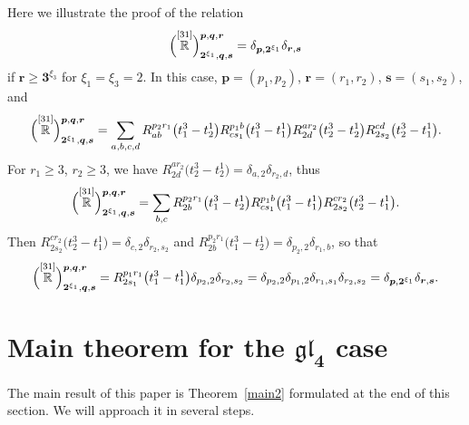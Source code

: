 \documentclass[10pt,a4paper]{amsart}
\numberwithin{equation}{section}
\begin{document}
\begin{Example} Here we illustrate the proof of the relation
\[
\Bigl(\overset{[31]}{\mathbb{R}} \Big)^{\boldsymbol{p},\boldsymbol{q},\boldsymbol{r}}_{\boldsymbol{2}^{\xi_1}, \boldsymbol{q},\boldsymbol{s}}=\delta_{\boldsymbol{p},\boldsymbol{2}^{\xi_1}} \delta_{\boldsymbol{r},\boldsymbol{s}}
\]
 if $\boldsymbol{r}\geq \boldsymbol {3}^{\xi_3}$ for $\xi_1=\xi_3=2$. In this case, $ \boldsymbol{p}=(p_1,p_2)$, $\boldsymbol{r}=(r_1,r_2)$, $\boldsymbol{s}=(s_1,s_2)
$, and
\begin{equation*}
\Bigl(\overset{[31]}{\mathbb{R}} \Big)^{\boldsymbol{p},\boldsymbol{q},\boldsymbol{r}}_{\boldsymbol{2}^{\xi_1},\boldsymbol{q},\boldsymbol{s}}= \sum_{a,b,c,d}{R}^{p_2r_1}_{ab}\bigl(t^3_1-t^1_2\bigr) {R}^{p_1 b}_{cs_1}\bigl(t^3_1-t^1_1\bigr) {R}^{ar_2}_{2d}\bigl(t^3_2-t^1_2\bigr) {R}^{cd}_{2s_2}\bigl(t^3_2-t^1_1\bigr).
\end{equation*}
For $r_1\geq 3$, $r_2\geq 3$, we have ${R}^{ar_2}_{2d}\bigl(t^3_2-t^1_2\bigr)=\delta_{a,2} \delta_{r_2,d}$, thus
\begin{equation*}
\Bigl(\overset{[31]}{\mathbb{R}} \Big)^{\boldsymbol{p},\boldsymbol{q},\boldsymbol{r}}_{\boldsymbol{2}^{\xi_1},\boldsymbol{q},\boldsymbol{s}}= \sum_{b,c}{R}^{p_2r_1}_{2b}\bigl(t^3_1-t^1_2\bigr) {R}^{p_1 b}_{cs_1}\bigl(t^3_1-t^1_1\bigr) {R}^{cr_2}_{2s_2}\bigl(t^3_2-t^1_1\bigr).
\end{equation*}
Then ${R}^{cr_2}_{2s_2}\bigl(t^3_2-t^1_1\bigr)=\delta_{c,2} \delta_{r_2,s_2}$ and ${R}^{p_2r_1}_{2b}\bigl(t^3_1-t^1_2\bigr)=\delta_{p_2,2} \delta_{r_1,b}$, so that
\begin{equation*}
\Bigl(\overset{[31]}{\mathbb{R}} \Big)^{\boldsymbol{p},\boldsymbol{q},\boldsymbol{r}}_{\boldsymbol{2}^{\xi_1},\boldsymbol{q},\boldsymbol{s}}= {R}^{p_1 r_1}_{2s_1}\bigl(t^3_1-t^1_1\bigr) \delta_{p_2,2} \delta_{r_2,s_2} =\delta_{p_2,2} \delta_{p_1,2} \delta_{r_1,s_1} \delta_{r_2,s_2}=\delta_{\boldsymbol{p},\boldsymbol{2}^{\xi_1}} \delta_{\boldsymbol{r},\boldsymbol{s}}.
\end{equation*}
\end{Example}

\section[Main theorem for the gl\_4 case]{Main theorem for the $\boldsymbol{\mathfrak{gl}_4}$ case}

The main result of this paper is Theorem~\ref{main2} formulated at the end of this section. We will approach it in several steps.
\end{document}

